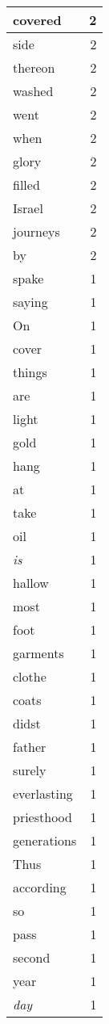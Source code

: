 \begin{center}
\begin{longtable}{l|r}
covered & 2 \\ \hline
side & 2 \\ \hline
thereon & 2 \\ \hline
washed & 2 \\ \hline
went & 2 \\ \hline
when & 2 \\ \hline
glory & 2 \\ \hline
filled & 2 \\ \hline
Israel & 2 \\ \hline
journeys & 2 \\ \hline
by & 2 \\ \hline
spake & 1 \\ \hline
saying & 1 \\ \hline
On & 1 \\ \hline
cover & 1 \\ \hline
things & 1 \\ \hline
are & 1 \\ \hline
light & 1 \\ \hline
gold & 1 \\ \hline
hang & 1 \\ \hline
at & 1 \\ \hline
take & 1 \\ \hline
oil & 1 \\ \hline
\emph{is} & 1 \\ \hline
hallow & 1 \\ \hline
most & 1 \\ \hline
foot & 1 \\ \hline
garments & 1 \\ \hline
clothe & 1 \\ \hline
coats & 1 \\ \hline
didst & 1 \\ \hline
father & 1 \\ \hline
surely & 1 \\ \hline
everlasting & 1 \\ \hline
priesthood & 1 \\ \hline
generations & 1 \\ \hline
Thus & 1 \\ \hline
according & 1 \\ \hline
so & 1 \\ \hline
pass & 1 \\ \hline
second & 1 \\ \hline
year & 1 \\ \hline
\emph{day} & 1 \\ \hline

\end{longtable}
\end{center}
